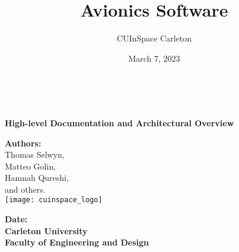 \title{Avionics Software}
\author{CUInSpace Carleton}
\date{March 7, 2023}

\makeatletter
    \begin{titlepage}
        \begin{center}

            {\fontsize{34}{50}\selectfont \bf \@title}\\ 
            \vspace{5cm}

            {\bf\Large High-level Documentation and Architectural Overview}\\
            \vspace{3cm}

            {\large \textbf{Authors:}}\\
            {\large Thomas Selwyn,}\\
            {\large Matteo Golin,}\\
            {\large Hamnah Qureshi,}\\
            {\large and others.}\\
            \texttt{[image: cuinspace\_logo]}
            \vspace{1cm}
            
            {\large \textbf{Date:} \@date}\\
            {\large \textbf{Carleton University}}\\
            {\large \textbf{Faculty of Engineering and Design}}\\
        \end{center}
    \end{titlepage}
\makeatother